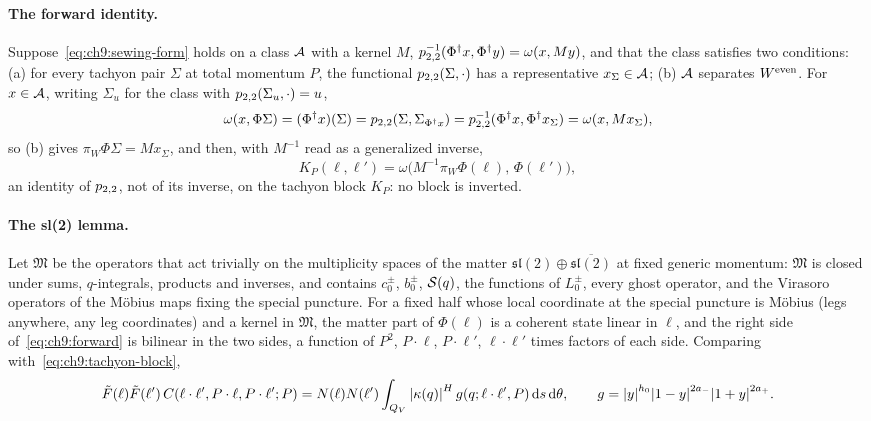 \paragraph{The forward identity.}
Suppose~\eqref{eq:ch9:sewing-form} holds on a class ${\mathcal{A}}$ with a kernel $M$, $p_{2,2}^{-1}(\Phi^\dagger x, \Phi^\dagger y) = \omega(x, M y)$, and that the class satisfies two conditions: (a) for every tachyon pair $\Sigma$ at total momentum $P$, the functional $p_{2,2}(\Sigma, \cdot)$ has a representative $x_\Sigma \in {\mathcal{A}}$; (b) ${\mathcal{A}}$ separates $W^{\rm even}$.
For $x \in {\mathcal{A}}$, writing $\Sigma_u$ for the class with $p_{2,2}(\Sigma_u, \cdot) = u$,
\begin{equation}
  \label{eq:ch9:forward-chain}
  \omega(x, \Phi \Sigma)
    = (\Phi^\dagger x)(\Sigma)
    = p_{2,2}(\Sigma, \Sigma_{\Phi^\dagger x})
    = p_{2,2}^{-1}(\Phi^\dagger x, \Phi^\dagger x_\Sigma)
    = \omega(x, M x_\Sigma),
\end{equation}
so (b) gives $\pi_W \Phi \Sigma = M x_\Sigma$, and then, with $M^{-1}$ read as a generalized inverse,
\begin{equation}
  \label{eq:ch9:forward}
  K_P(\ell, \ell')
    = \omega \big( M^{-1} \pi_W \Phi(\ell), \, \Phi(\ell') \big),
\end{equation}
an identity of $p_{2,2}$, not of its inverse, on the tachyon block $K_P$: no block is inverted.

\paragraph{The sl(2) lemma.}
Let $\mathfrak M$ be the operators that act trivially on the multiplicity spaces of the matter $\mathfrak{sl}(2) \oplus \overline{\mathfrak{sl}(2)}$ at fixed generic momentum: $\mathfrak M$ is closed under sums, $q$-integrals, products and inverses, and contains $c_0^\pm$, $b_0^\pm$, ${\mathcal{S}}(q)$, the functions of $L_0^\pm$, every ghost operator, and the Virasoro operators of the Möbius maps fixing the special puncture.
For a fixed half whose local coordinate at the special puncture is Möbius (legs anywhere, any leg coordinates) and a kernel in $\mathfrak M$, the matter part of $\Phi(\ell)$ is a coherent state linear in $\ell$, and the right side of~\eqref{eq:ch9:forward} is bilinear in the two sides, a function of $P^2$, $P \cdot \ell$, $P \cdot \ell'$, $\ell \cdot \ell'$ times factors of each side.
Comparing with~\eqref{eq:ch9:tachyon-block},
\begin{equation}
  \label{eq:ch9:compare}
  \tilde F(\ell) \tilde F(\ell') \, C(\ell \cdot \ell', P \cdot \ell, P \cdot \ell'; P)
    = N(\ell) N(\ell') \int_{Q_V} {|\kappa(q)|}^{H} \, g(q; \ell \cdot \ell', P) \, \mathrm{d} s \, \mathrm{d} \theta,
  \qquad
  g
    = {|y|}^{h_0} {|1 - y|}^{2 a_-} {|1 + y|}^{2 a_+}.
\end{equation}

